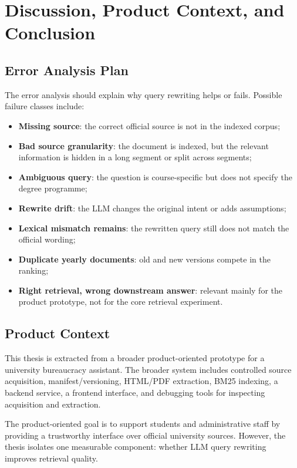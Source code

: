 \chapter{Discussion, Product Context, and Conclusion}

\section{Error Analysis Plan}
The error analysis should explain why query rewriting helps or fails. Possible failure classes include:

\begin{itemize}
    \item \textbf{Missing source}: the correct official source is not in the indexed corpus;
    \item \textbf{Bad source granularity}: the document is indexed, but the relevant information is hidden in a long segment or split across segments;
    \item \textbf{Ambiguous query}: the question is course-specific but does not specify the degree programme;
    \item \textbf{Rewrite drift}: the LLM changes the original intent or adds assumptions;
    \item \textbf{Lexical mismatch remains}: the rewritten query still does not match the official wording;
    \item \textbf{Duplicate yearly documents}: old and new versions compete in the ranking;
    \item \textbf{Right retrieval, wrong downstream answer}: relevant mainly for the product prototype, not for the core retrieval experiment.
\end{itemize}

\section{Product Context}
This thesis is extracted from a broader product-oriented prototype for a university bureaucracy assistant. The broader system includes controlled source acquisition, manifest/versioning, HTML/PDF extraction, BM25 indexing, a backend service, a frontend interface, and debugging tools for inspecting acquisition and extraction.

The product-oriented goal is to support students and administrative staff by providing a trustworthy interface over official university sources. However, the thesis isolates one measurable component: whether LLM query rewriting improves retrieval quality.

